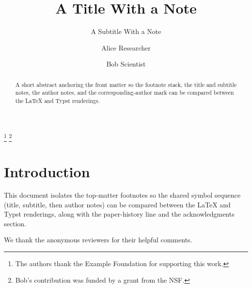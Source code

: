 \documentclass[acmsmall]{acmart}
\begin{document}
\title{A Title With a Note}
\thanks{The authors thank the Example Foundation for supporting this work.}
\thanks{Bob's contribution was funded by a grant from the NSF.}
\subtitle{A Subtitle With a Note}

\author{Alice Researcher}

\author{Bob Scientist}
\correspondingauthor
{}

\renewcommand{\shortauthors}{Researcher and Scientist}

\begin{abstract}
  A short abstract anchoring the front matter so the footnote stack, the title
  and subtitle notes, the author notes, and the corresponding-author mark can be
  compared between the LaTeX and Typst renderings.
\end{abstract}


\maketitle

\section{Introduction}
This document isolates the top-matter footnotes so the shared symbol sequence
(title, subtitle, then author notes) can be compared between the LaTeX and Typst
renderings, along with the paper-history line and the acknowledgments section.

\begin{acks}
We thank the anonymous reviewers for their helpful comments.
\end{acks}
\end{document}
